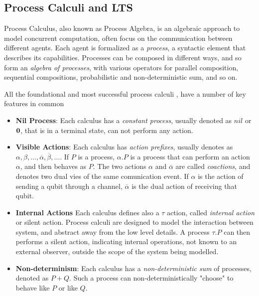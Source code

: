 \subsection{Process Calculi and LTS}


Process Calculus, also known as Process Algebra, is an algebraic approach to model concurrent computation, often focus on the communication between different agents. Each agent is formalized as a \textit{process}, a syntactic element that describes its capabilities. Processes can be composed in different ways, and so form an \textit{algebra of processes}, with various operators for parallel composition, sequential compositions, probabilistic and non-deterministic sum, and so on.

All the foundational and most successful process calculi \cite{milnerCalculusCommunicatingSystems1980, bergstraAlgebraCommunicatingProcesses1985, 
hoareCommunicatingSequentialProcesses1978, milnerCommunicatingMobileSystems1999},  have a number of key features in common \begin{itemize}
\item \textbf{Nil Process}: Each calculus has a \textit{constant process}, usually denoted as $nil$ or $\mathbf{0}$, that is in a terminal state, can not perform any action.
\item \textbf{Visible Actions}: Each calculus has \textit{action prefixes}, usually denotes as $\alpha, \beta, \ldots, \overline{\alpha}, \overline{\beta}, \ldots$. If $P$ is a process, $\alpha.P$ is a process that can perform an action $\alpha$, and then behaves as $P$. The two actions $\alpha$ and $\overline{\alpha}$ are called \textit{coactions}, and denotes two dual vies of the same comunication event. If $\alpha$ is the action of sending a qubit through a channel, $\overline{\alpha}$ is the dual action of receiving that qubit. 
\item \textbf{Internal Actions} Each calculus defines also a $\tau$ action, called \textit{internal action} or silent action. Process calculi are designed to model the interaction between system, and abstract away from the low level details. A process $\tau.P$ can then performs a silent action, indicating internal operations, not known to an external observer, outside the scope of the system being modelled. 
\item \textbf{Non-determinism}: Each calculus has a \textit{non-deterministic sum} of processes, denoted as $P + Q$. Such a process can non-deterministically "choose" to behave like $P$ or like $Q$. 

\end{itemize}
